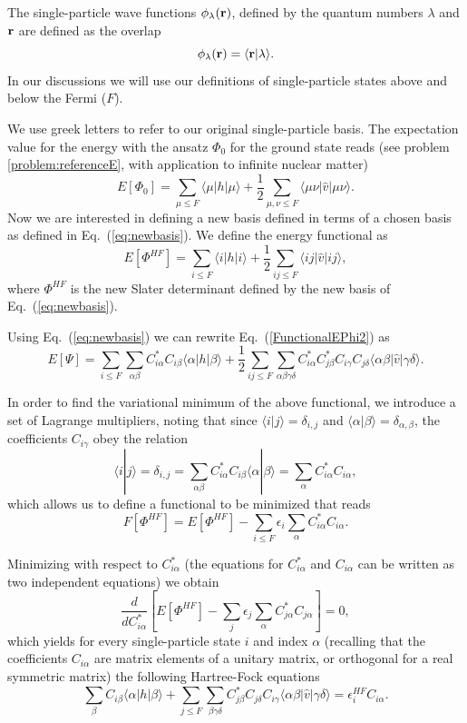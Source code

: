 The single-particle wave functions $\phi_{\lambda}({\bf r})$, defined
by the quantum numbers $\lambda$ and ${\bf r}$ are defined as the
overlap
\[
   \phi_{\lambda}({\bf r}) = \langle {\bf r} | \lambda \rangle .
\]
In our discussions we will use our definitions of single-particle
states above and below the Fermi ($F$).  


We use greek letters to refer to our original single-particle
basis. The expectation value for the energy with the ansatz $\Phi_0$
for the ground state reads (see problem \ref{problem:referenceE}, with
application to infinite nuclear matter)
\[
  E[\Phi_0] = \sum_{\mu\le F} \langle \mu | h | \mu \rangle +
  \frac{1}{2}\sum_{{\mu},{\nu}\le F} \langle
  \mu\nu|\hat{v}|\mu\nu\rangle.
\]
Now we are interested in defining a new basis defined in terms of a
chosen basis as defined in Eq.~(\ref{eq:newbasis}). We define the energy functional as
\begin{equation}
  E[\Phi^{HF}] = \sum_{i\le F} \langle i | h | i \rangle +
  \frac{1}{2}\sum_{ij\le F}\langle
  ij|\hat{v}|ij\rangle, \label{FunctionalEPhi2}
\end{equation}
where $\Phi^{HF}$ is the new Slater determinant defined by the new
basis of Eq.~(\ref{eq:newbasis}).


Using Eq.~(\ref{eq:newbasis}) we can rewrite
Eq.~(\ref{FunctionalEPhi2}) as
\begin{equation}
  E[\Psi] = \sum_{i\le F} \sum_{\alpha\beta}
  C^*_{i\alpha}C_{i\beta}\langle \alpha | h | \beta \rangle +
  \frac{1}{2}\sum_{ij\le F}\sum_{{\alpha\beta\gamma\delta}}
  C^*_{i\alpha}C^*_{j\beta}C_{i\gamma}C_{j\delta}\langle
  \alpha\beta|\hat{v}|\gamma\delta\rangle. \label{FunctionalEPhi3}
\end{equation}


In order to find the variational minimum of the above functional, we introduce a set of
Lagrange multipliers, noting that since $\langle i | j \rangle =
\delta_{i,j}$ and $\langle \alpha | \beta \rangle =
\delta_{\alpha,\beta}$, the coefficients $C_{i\gamma}$ obey the
relation
\[
 \langle i | j \rangle=\delta_{i,j}=\sum_{\alpha\beta}
 C^*_{i\alpha}C_{i\beta}\langle \alpha | \beta \rangle= \sum_{\alpha}
 C^*_{i\alpha}C_{i\alpha},
\]
which allows us to define a functional to be minimized that reads
\begin{equation}
  F[\Phi^{HF}]=E[\Phi^{HF}] - \sum_{i\le F}\epsilon_i\sum_{\alpha}
  C^*_{i\alpha}C_{i\alpha}.
\end{equation}


Minimizing with respect to $C^*_{i\alpha}$ (the equations for
$C^*_{i\alpha}$ and $C_{i\alpha}$ can be written as two independent
equations) we obtain
\[
\frac{d}{dC^*_{i\alpha}}\left[ E[\Phi^{HF}] -
  \sum_{j}\epsilon_j\sum_{\alpha} C^*_{j\alpha}C_{j\alpha}\right]=0,
\]
which yields for every single-particle state $i$ and index $\alpha$
(recalling that the coefficients $C_{i\alpha}$ are matrix elements of
a unitary matrix, or orthogonal for a real symmetric matrix) the
following Hartree-Fock equations
\[
\sum_{\beta} C_{i\beta}\langle \alpha | h | \beta \rangle+
\sum_{j\le F}\sum_{\beta\gamma\delta}
C^*_{j\beta}C_{j\delta}C_{i\gamma}\langle
\alpha\beta|\hat{v}|\gamma\delta\rangle=\epsilon_i^{HF}C_{i\alpha}.
\]


